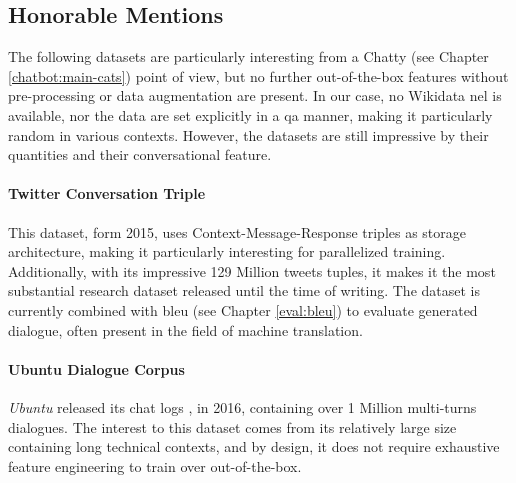 \subsection{Honorable Mentions}
The following datasets are particularly interesting from a Chatty (see Chapter \ref{chatbot:main-cats}) point of view, but no further out-of-the-box features without pre-processing or data augmentation are present. In our case, no Wikidata \gls{nel}  is available, nor the data are set explicitly in a \gls{qa} manner, making it particularly random in various contexts. However, the datasets are still impressive by their quantities and their conversational feature.

\paragraph{Twitter Conversation Triple}
This dataset, form 2015, uses Context-Message-Response triples as storage architecture, making it particularly interesting for parallelized training. Additionally, with its impressive 129 Million tweets tuples, it makes it the most substantial research dataset released until the time of writing. The dataset is currently combined with \gls{bleu} (see Chapter \ref{eval:bleu}) to evaluate generated dialogue, often present in the field of machine translation.

\paragraph{Ubuntu Dialogue Corpus}
\textit{Ubuntu} released its chat logs \autocite{paper:journals/corr/LowePSP15}, in 2016, containing over 1 Million multi-turns dialogues. The interest to this dataset comes from its relatively large size containing long technical contexts, and by design, it does not require exhaustive feature engineering to train over out-of-the-box.




